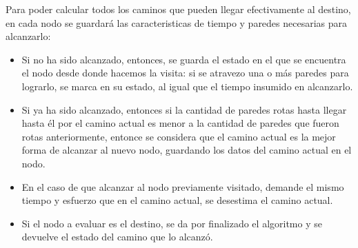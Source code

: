 Para poder calcular todos los caminos que pueden llegar efectivamente al destino, en cada nodo se guardará las caracteristicas de tiempo y paredes necesarias para alcanzarlo:
\begin{itemize}
\item Si no ha sido alcanzado, entonces, se guarda el estado en el que se encuentra el nodo desde donde hacemos la visita: si se atravezo una o más paredes para lograrlo, se marca en su estado, al igual que el tiempo insumido en alcanzarlo.
\item Si ya ha sido alcanzado, entonces si la cantidad de paredes rotas hasta llegar hasta él por el camino actual es menor a la cantidad de paredes que fueron rotas anteriormente, entonce se considera que el camino actual es la mejor forma de alcanzar al nuevo nodo, guardando los datos del camino actual en el nodo.
\item En el caso de que alcanzar al nodo previamente visitado, demande el mismo tiempo y esfuerzo que en el camino actual, se desestima el camino actual.
\item Si el nodo a evaluar es el destino, se da por finalizado el algoritmo y se devuelve el estado del camino que lo alcanzó.
\end{itemize}
